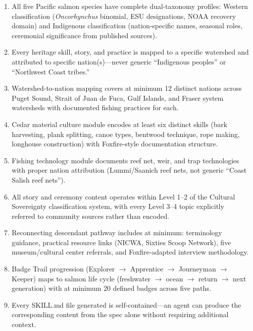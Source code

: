 \documentclass[11pt,letterpaper]{article}
\begin{document}
\begin{enumerate}[leftmargin=2em]
\item All five Pacific salmon species have complete dual-taxonomy profiles: Western classification (\textit{Oncorhynchus} binomial, ESU designations, NOAA recovery domain) and Indigenous classification (nation-specific names, seasonal roles, ceremonial significance from published sources).

\item Every heritage skill, story, and practice is mapped to a specific watershed and attributed to specific nation(s)---never generic ``Indigenous peoples'' or ``Northwest Coast tribes.''

\item Watershed-to-nation mapping covers at minimum 12 distinct nations across Puget Sound, Strait of Juan de Fuca, Gulf Islands, and Fraser system watersheds with documented fishing practices for each.

\item Cedar material culture module encodes at least six distinct skills (bark harvesting, plank splitting, canoe types, bentwood technique, rope making, longhouse construction) with Foxfire-style documentation structure.

\item Fishing technology module documents reef net, weir, and trap technologies with proper nation attribution (Lummi/Saanich reef nets, not generic ``Coast Salish reef nets'').

\item All story and ceremony content operates within Level 1--2 of the Cultural Sovereignty classification system, with every Level 3--4 topic explicitly referred to community sources rather than encoded.

\item Reconnecting descendant pathway includes at minimum: terminology guidance, practical resource links (NICWA, Sixties Scoop Network), five museum/cultural center referrals, and Foxfire-adapted interview methodology.

\item Badge Trail progression (Explorer $\rightarrow$ Apprentice $\rightarrow$ Journeyman $\rightarrow$ Keeper) maps to salmon life cycle (freshwater $\rightarrow$ ocean $\rightarrow$ return $\rightarrow$ next generation) with at minimum 20 defined badges across five paths.

\item Every SKILL.md file generated is self-contained---an agent can produce the corresponding content from the spec alone without requiring additional context.


\end{enumerate}
\end{document}

